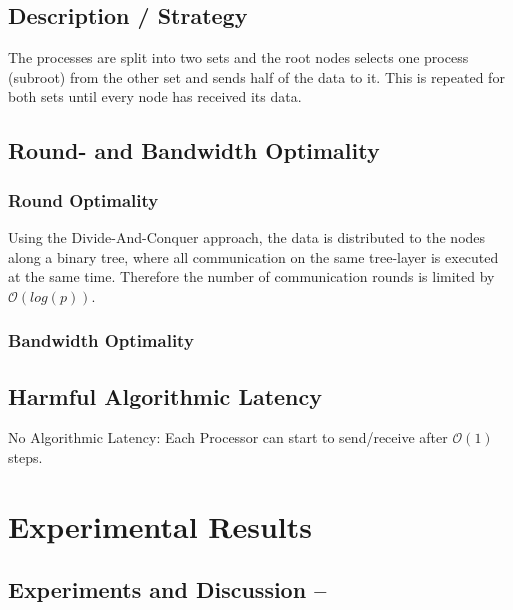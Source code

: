 \subsection{Description / Strategy}

The processes are split into two sets and the root nodes selects one process (subroot) from the other set and sends half of the data to it. This is repeated for both sets until every node has received its data.

\subsection{Round- and Bandwidth Optimality}

\subsubsection{Round Optimality}
Using the Divide-And-Conquer approach, the data is distributed to the nodes along a binary tree, where all communication on the same tree-layer is executed at the same time. Therefore the number of communication rounds is limited by $\mathcal{O}(log(p))$.

\subsubsection{Bandwidth Optimality}



\subsection{Harmful Algorithmic Latency}

No Algorithmic Latency: Each Processor can start to send/receive after $\mathcal{O}(1)$ steps.

\section{Experimental Results}

\subsection{Experiments and Discussion -- \mygather}

